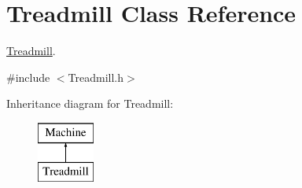 \hypertarget{class_treadmill}{}\section{Treadmill Class Reference}
\label{class_treadmill}


\hyperlink{class_treadmill}{Treadmill}.  




{\ttfamily \#include $<$Treadmill.\+h$>$}

Inheritance diagram for Treadmill\+:\begin{figure}[H]
\begin{center}
\leavevmode
\includegraphics[height=2.000000cm]{class_treadmill}
\end{center}
\end{figure}
